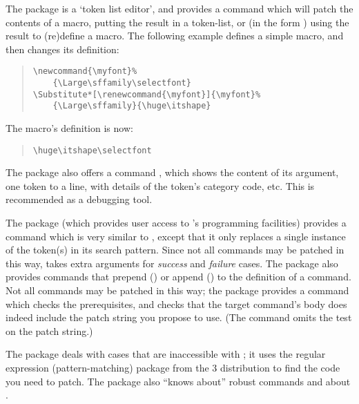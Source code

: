 The  package is a `token list editor', and provides a
command  which will patch the
contents of a macro, putting the result in a token-list, or
(in the form ) using the result to (re)define a
macro.  The following example defines a simple macro, and then changes
its definition:
\begin{quote}
\begin{verbatim}
\newcommand{\myfont}%
    {\Large\sffamily\selectfont}
\Substitute*[\renewcommand{\myfont}]{\myfont}%
    {\Large\sffamily}{\huge\itshape}
\end{verbatim}
\end{quote}
The macro's definition is now:
\begin{quote}
\begin{verbatim}
\huge\itshape\selectfont
\end{verbatim}
\end{quote}

The package also offers a command , which shows the
content of its argument, one token to a line, with details of the
token's category code, etc.  This is recommended as a debugging tool.

The  package (which provides user access to \eTeX{}'s
programming facilities) provides a command  which is
very similar to , except that it only replaces a
single instance of the token(s) in its search pattern.  Since not all
commands may be patched in this way,  takes extra
arguments for \emph{success} and \emph{failure} cases.  The
package also provides commands that prepend () or append
() to the definition of a command.  Not all commands may
be patched in this way; the package provides a command
 which checks the prerequisites, and checks that the
target command's body does indeed include the patch string you propose
to use.  (The command  omits the test on the patch
string.)

The  package deals with cases that are
inaccessible with ; it uses the regular expression
(pattern-matching) package  from the \latex{}3
distribution to find the code you need to patch.  The package also
``knows about'' robust commands and about
.

